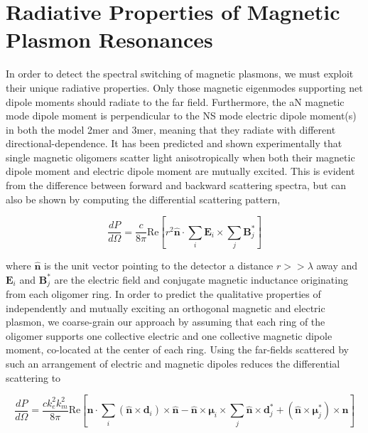 \documentclass[journal=apchd5,manuscript=article]{achemso}
\begin{document}
\section{Radiative Properties of Magnetic Plasmon Resonances}
In order to detect the spectral switching of magnetic plasmons, we must exploit their unique radiative properties. Only those magnetic eigenmodes supporting net dipole moments should radiate to the far field. Furthermore, the aN magnetic mode dipole moment is perpendicular to the NS mode electric dipole moment(s) in both the model 2mer and 3mer, meaning that they radiate with different directional-dependence. It has been predicted and shown experimentally that single magnetic oligomers scatter light anisotropically when both their magnetic dipole moment and electric dipole moment are mutually excited.\cite{Dionne2011,Cherqui2016} This is evident from the difference between forward and backward scattering spectra, but can also be shown by computing the differential scattering pattern,\cite{jackson_classical_1999,schwinger1998classical}

\begin{equation}
\frac{dP}{d\Omega} = \frac{c}{8\pi}\textrm{Re}\left[r^2\hat{\textbf{n}}\cdot\sum_i\textbf{E}_i \times \sum_{j}\textbf{B}_{j}^*\right]
\label{dp_field_1}
\end{equation}

\noindent where $\hat{\textbf{n}}$ is the unit vector pointing to the detector a distance $r >> \lambda$ away and $\textbf{E}_i$ and $\textbf{B}_j^*$ are the electric field and conjugate magnetic inductance originating from each oligomer ring. In order to predict the qualitative properties of independently and mutually exciting an orthogonal magnetic and electric plasmon, we coarse-grain our approach by assuming that each ring of the oligomer supports one collective electric and one collective magnetic dipole moment, co-located at the center of each ring. Using the far-fields scattered by such an arrangement of electric and magnetic dipoles reduces the differential scattering to\cite{Engheta2006}

\begin{equation}
\frac{dP}{d\Omega} = \frac{ck_e^2k_m^2}{8\pi} \textrm{Re} \left[\hat{\textbf{n}} \cdot \sum_{i} (\hat{\textbf{n}} \times \textbf{d}_i) \times \hat{\textbf{n}} - \hat{\textbf{n}} \times \boldsymbol{\mu}_i \times \sum_{j} \hat{\textbf{n}} \times \textbf{d}_j^* + (\hat{\textbf{n}} \times \boldsymbol{\mu}_j^*) \times \hat{\textbf{n}}\right]
\label{dp_coarse_grain}
\end{equation}
\end{document}
